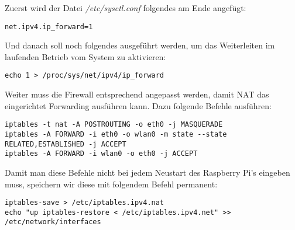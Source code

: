 Zuerst wird der Datei \textit{/etc/sysctl.conf} folgendes am Ende angefügt:

\begin{lstlisting}
net.ipv4.ip_forward=1
\end{lstlisting} 

Und danach soll noch folgendes ausgeführt werden, um das Weiterleiten im laufenden Betrieb vom System zu aktivieren:

\begin{lstlisting}
echo 1 > /proc/sys/net/ipv4/ip_forward
\end{lstlisting}

Weiter muss die Firewall entsprechend angepasst werden, damit NAT das eingerichtet Forwarding ausführen kann.
Dazu folgende Befehle ausführen:

\begin{lstlisting}
iptables -t nat -A POSTROUTING -o eth0 -j MASQUERADE
iptables -A FORWARD -i eth0 -o wlan0 -m state --state RELATED,ESTABLISHED -j ACCEPT
iptables -A FORWARD -i wlan0 -o eth0 -j ACCEPT
\end{lstlisting}

Damit man diese Befehle nicht bei jedem Neustart des Raspberry Pi's eingeben muss, speichern wir diese mit folgendem Befehl permanent:

\begin{lstlisting}
iptables-save > /etc/iptables.ipv4.nat
echo "up iptables-restore < /etc/iptables.ipv4.net" >> /etc/network/interfaces
\end{lstlisting}


